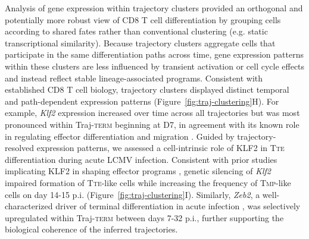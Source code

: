 Analysis of gene expression within trajectory clusters provided an orthogonal and potentially more robust view of CD8 T cell differentiation by grouping cells according to shared fates rather than conventional clustering (e.g. static transcriptional similarity). Because trajectory clusters aggregate cells that participate in the same differentiation paths across time, gene expression patterns within these clusters are less influenced by transient activation or cell cycle effects and instead reflect stable lineage-associated programs. Consistent with established CD8 T cell biology, trajectory clusters displayed distinct temporal and path-dependent expression patterns (Figure~\ref{fig:traj-clustering}H). For example, \emph{Klf2} expression increased over time across all trajectories but was most pronounced within Traj-\textsc{term} beginning at D7, in agreement with its known role in regulating effector differentiation and migration \citep{fagerbergKLF2MaintainsLineage2025, carlsonKruppellikeFactor22006}. Guided by trajectory-resolved expression patterns, we assessed a cell-intrinsic role of KLF2 in T\textsc{te} differentiation during acute LCMV infection. Consistent with prior studies implicating KLF2 in shaping effector programs \citep{fagerbergKLF2MaintainsLineage2025, greenEnhancerdrivenGeneRegulatory2025}, genetic silencing of \emph{Klf2} impaired formation of T\textsc{te}-like cells while increasing the frequency of T\textsc{mp}-like cells on day 14-15 p.i. (Figure~\ref{fig:traj-clustering}I). Similarly, \emph{Zeb2}, a well-characterized driver of terminal differentiation in acute infection \citep{greenEnhancerdrivenGeneRegulatory2025, fagerbergKLF2MaintainsLineage2025}, was selectively upregulated within Traj-\textsc{term} between days 7-32 p.i., further supporting the biological coherence of the inferred trajectories.

